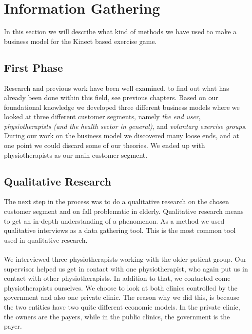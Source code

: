 \chapter{Information Gathering}

In this section we will describe what kind of methods we have used to make a business model for the Kinect based exercise game. 

\section{First Phase}
Research and previous work have been well examined, to find out what has already been done within this field, see previous chapters. Based on our foundational knowledge we developed three different business models where we looked at three different customer segments, namely \emph{the end user}, \emph{physiotherapists (and the health sector in general)}, and \emph{voluntary exercise groups}. During our work on the business model we discovered many loose ends, and at one point we could discard some of our theories. We ended up with physiotherapists as our main customer segment.

\section{Qualitative Research}
The next step in the process was to do a qualitative research on the chosen customer segment and on fall problematic in elderly. Qualitative research means to get an in-depth understanding of a phenomenon. As a method we used qualitative interviews as a data gathering tool. This is the most common tool used in qualitative research.  \cite{interview2} \\ \\
We interviewed three physiotherapists working with the older patient group. Our supervisor helped us get in contact with one physiotherapist, who again put us in contact with other physiotherapists. In addition to that, we contacted come physiotherapists ourselves. We choose to look at both clinics controlled by the government and also one private clinic. The reason why we did this, is because the two entities have two quite different economic models. In the private clinic, the owners are the payers, while in the public clinics, the government is the payer.

